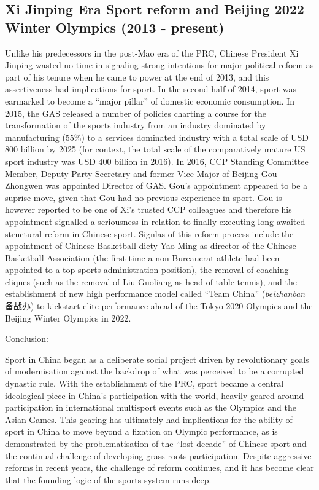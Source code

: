 {\subsection{Xi Jinping Era Sport reform and Beijing 2022 Winter Olympics (2013 - present)}

Unlike his predecessors in the post-Mao era of the PRC, Chinese President Xi Jinping wasted no time in signaling strong intentions for major political reform as part of his tenure when he came to power at the end of 2013, and this assertiveness had implications for sport.  In the second half of 2014, sport was earmarked to become a ``major pillar'' of domestic economic consumption. In 2015, the GAS released a number of policies charting a course for the transformation of the sports industry from an industry dominated by manufacturing (55\%) to a services dominated industry with a total scale of USD 800 billion by 2025 (for context, the total scale of the comparatively mature US sport industry was USD 400 billion in 2016).  In 2016, CCP Standing Committee Member, Deputy Party Secretary and former Vice Major of Beijing Gou Zhongwen was appointed Director of GAS.  Gou's appointment appeared to be a suprise move, given that Gou had no previous experience in sport. Gou is however reported to be one of Xi's trusted CCP colleagues and therefore his appointment signalled a seriousness in relation to finally executing long-awaited structural reform in Chinese sport.  Signlas of this reform process include the appointment of Chinese Basketball diety Yao Ming as director of the Chinese Basketball Association (the first time a non-Bureaucrat athlete had been appointed to a top sports administration position), the removal of coaching cliques (such as the removal of Liu Guoliang as head of table tennis), and the establishment of new high performance model called ``Team China'' (\textit{beizhanban} 备战办) to kickstart elite performance ahead of the Tokyo 2020 Olympics and the Beijing Winter Olympics in 2022.




Conclusion:

Sport in China began as a deliberate social project driven by revolutionary goals of modernisation against the backdrop of what was perceived to be a corrupted dynastic rule.  With the establishment of the PRC, sport became a central ideological piece in China's participation with the world, heavily geared around participation in international multisport events such as the Olympics and the Asian Games. This gearing has ultimately had implications for the ability of sport in China to move beyond a fixation on Olympic performance, as is demonstrated by the problematisation of the ``lost decade'' of Chinese sport and the continual challenge of developing grass-roots participation.  Despite aggressive reforms in recent years, the challenge of reform continues, and it has become clear that the founding logic of the sports system runs deep.






}

